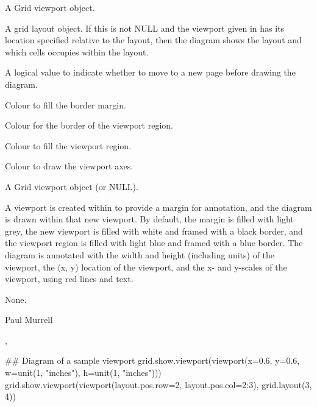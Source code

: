 \begin{Arguments}
\begin{ldescription}
\item[\code{v}] A Grid viewport object.
\item[\code{parent.layout}] A grid layout object.  If this is not NULL and
the viewport given in  has its location specified relative
to the layout, then the diagram shows the layout and which cells
 occupies within the layout.
\item[\code{newpage}] A logical value to indicate whether to move to
a new page before drawing the diagram.
\item[\code{border.fill}] Colour to fill the border margin.
\item[\code{vp.col}] Colour for the border of the viewport region.
\item[\code{vp.fill}] Colour to fill the viewport region.
\item[\code{scale.col}] Colour to draw the viewport axes.
\item[\code{vp}] A Grid viewport object (or NULL).
\end{ldescription}
\end{Arguments}
%
\begin{Details}\relax
A viewport is created within  to provide a margin for
annotation, and the diagram is drawn within that new viewport.
By default, the margin is filled with light grey, the new viewport is filled
with white and framed with a black border, and the viewport region
is filled with light blue and framed with a blue border.
The diagram is annotated with the width and height (including units)
of the viewport, the (x, y) location of the viewport, and
the x- and y-scales of the viewport, using red lines and text.
\end{Details}
%
\begin{Value}
None.
\end{Value}
%
\begin{Author}\relax
Paul Murrell
\end{Author}
%
\begin{SeeAlso}\relax
{},
\end{SeeAlso}
%
\begin{Examples}
\begin{ExampleCode}
## Diagram of a sample viewport
grid.show.viewport(viewport(x=0.6, y=0.6,
                            w=unit(1, "inches"), h=unit(1, "inches")))
grid.show.viewport(viewport(layout.pos.row=2, layout.pos.col=2:3),
                   grid.layout(3, 4))
\end{ExampleCode}
\end{Examples}
